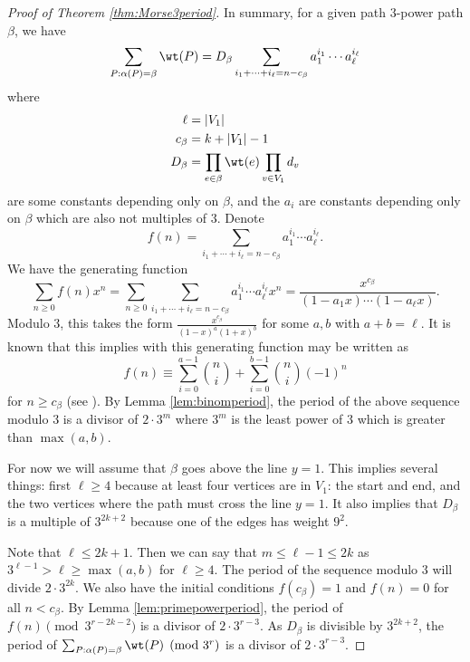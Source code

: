 \begin{proof}[Proof of Theorem \ref{thm:Morse3period}]
    In summary, for a given path $3$-power path $\beta$, we have
    \[\sum_{P: \alpha(P)=\beta}\wt(P)=D_{\beta}\sum_{i_1+\dotsb+i_{\ell}=n-c_{\beta}}a_1^{i_1}\dotsm a_{\ell}^{i_\ell}\]
    where 
    \begin{align*}
        \ell &= \lvert V_1\rvert \\
        c_{\beta} &=k+\lvert V_1\rvert-1 \\
        D_{\beta} &= \prod_{e\in \beta}\wt(e)\prod_{v\in V_1}d_v
    \end{align*}
    are some constants depending only on $\beta$, and the $a_i$ are constants depending only on $\beta$ which are also not multiples of $3$.
    Denote 
    \[f(n)=\sum_{i_1+\dotsb+i_{\ell}=n-c_{\beta}}a_1^{i_1}\dotsm a_{\ell}^{i_\ell}.\]
    We have the generating function
    \[\sum_{n\geq 0}f(n)x^n=\sum_{n\geq 0}\sum_{i_1+\dotsb+i_{\ell}=n-c_{\beta}}a_1^{i_1}\dotsm a_{\ell}^{i_\ell}x^n=\frac{x^{c_{\beta}}}{(1-a_1x)\dotsm (1-a_{\ell}x)}.\]
    Modulo $3$, this takes the form $\frac{x^{c_\beta}}{(1-x)^{a}(1+x)^b}$ for some $a, b$ with $a+b=\ell$. It is known that this implies with this generating function may be written as
    \[f(n)\equiv \sum_{i=0}^{a-1}\binom{n}{i}+\sum_{i=0}^{b-1}\binom{n}{i}(-1)^n\]
    for $n\geq c_{\beta}$ (see \cite{pinch1995recurrent}). By Lemma \ref{lem:binomperiod}, the period of the above sequence modulo $3$ is a divisor of $2\cdot 3^m$ where $3^m$ is the least power of $3$ which is greater than $\max(a, b)$.
    
    For now we will assume that $\beta$ goes above the line $y=1$. This implies several things: first $\ell\geq 4$ because at least four vertices are in $V_1$: the start and end, and the two vertices where the path must cross the line $y=1$. It also implies that $D_{\beta}$ is a multiple of $3^{2k+2}$ because one of the edges has weight $9^2$.
    
    Note that $\ell\leq 2k+1$. Then we can say that $m\leq \ell-1\leq 2k$ as $3^{\ell-1} > \ell \geq \max(a, b)$ for $\ell\geq 4$. The period of the sequence modulo $3$ will divide $2\cdot 3^{2k}$. We also have the initial conditions $f(c_{\beta})=1$ and $f(n)=0$ for all $n < c_{\beta}$. By Lemma \ref{lem:primepowerperiod}, the period of $f(n)\pmod{3^{r-2k-2}}$ is a divisor of $2\cdot 3^{r-3}$. As $D_{\beta}$ is divisible by $3^{2k+2}$, the period of $\sum_{P: \alpha(P)=\beta}\wt(P)\pmod{3^{r}}$ is a divisor of $2\cdot 3^{r-3}$.
    

\end{proof}
